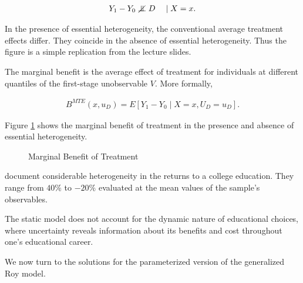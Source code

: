 \begin{boenumerate}
\begin{align*}
    Y_1 - Y_0 \notindep D\quad \mid X = x.
\end{align*}

In the presence of essential heterogeneity, the conventional average treatment effects differ. They coincide in the absence of essential heterogeneity. Thus the figure is a simple replication from the lecture slides.

\item The marginal benefit is the average effect of treatment for individuals at different quantiles of the first-stage unobservable $V$. More formally,

\begin{align*}
    B^{MTE}(x, u_D) = E [Y_1 - Y_0 \mid X = x,  U_D = u_D].
\end{align*}

Figure \ref{Marginal Benefit of Treatment} shows the marginal benefit of treatment in the presence and absence of essential heterogeneity.

\begin{figure}[h]\centering
\caption{Marginal Benefit of Treatment}\label{Marginal Benefit of Treatment}
\end{figure}

\item \cite{Carneiro.2011} document considerable heterogeneity in the returns to a college education. They range from $40\%$ to $-20\%$ evaluated at the mean values of the sample's observables.

\item The static model does not account for the dynamic nature of educational choices, where uncertainty reveals information about its benefits and cost throughout one's educational career.
\end{boenumerate}

We now turn to the solutions for the parameterized version of the generalized Roy model.

